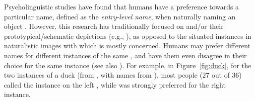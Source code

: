 Psycholinguistic studies have found that humans have a preference towards a particular name, defined as the \textit{entry-level name}, when naturally naming an object \cite{rosch1976basic,Rosch1978,jolicoeur1984pictures}. 
However, this research has traditionally focused on \categories and/or their prototypical/schematic depictions (e.g., ), as opposed to the situated instances in naturalistic images with which \lv is mostly concerned.
Humans may prefer different names for different instances of the same \category, and have them even disagree in their choice for the same instance (see also \citealt{graf2016animal}).
For example, in Figure~\ref{fig:duck}, for the two instances of a duck (from \vg, with names from \mn), most people (27 out of 36) called the instance on the left , while  was strongly preferred for the right instance. 
